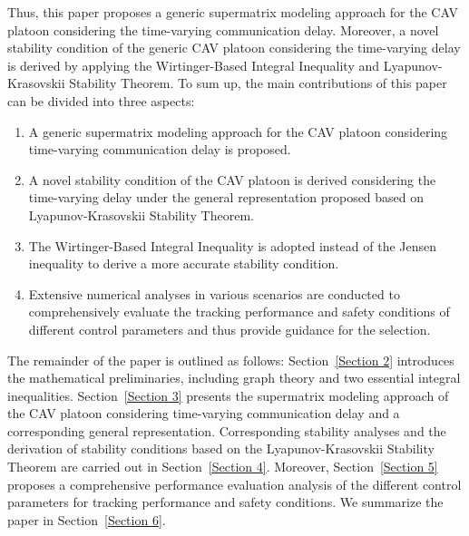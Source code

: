 \documentclass[a4paper]{cas-sc}
\begin{document}
Thus, this paper proposes a generic supermatrix modeling approach for the CAV platoon considering the time-varying communication delay. Moreover, a novel stability condition of the generic CAV platoon considering the time-varying delay is derived by applying the Wirtinger-Based Integral Inequality and Lyapunov-Krasovskii Stability Theorem. To sum up, the main contributions of this paper can be divided into three aspects:
\begin{enumerate}
  \item A generic supermatrix modeling approach for the CAV platoon considering time-varying communication delay is proposed.
  \item A novel stability condition of the CAV platoon is derived considering the time-varying delay under the general representation proposed based on Lyapunov-Krasovskii Stability Theorem.
  \item The Wirtinger-Based Integral Inequality is adopted instead of the Jensen inequality to derive a more accurate stability condition.
  \item Extensive numerical analyses in various scenarios are conducted to comprehensively evaluate the tracking performance and safety conditions of different control parameters and thus provide guidance for the selection.
\end{enumerate}
The remainder of the paper is outlined as follows: Section~\ref{Section 2} introduces the mathematical preliminaries, including graph theory and two essential integral inequalities. Section~\ref{Section 3} presents the supermatrix modeling approach of the CAV platoon considering time-varying communication delay and a corresponding general representation. Corresponding stability analyses and the derivation of stability conditions based on the Lyapunov-Krasovskii Stability Theorem are carried out in Section~\ref{Section 4}. Moreover, Section~\ref{Section 5} proposes a comprehensive performance evaluation analysis of the different control parameters for tracking performance and safety conditions. We summarize the paper in Section~\ref{Section 6}.
\end{document}
